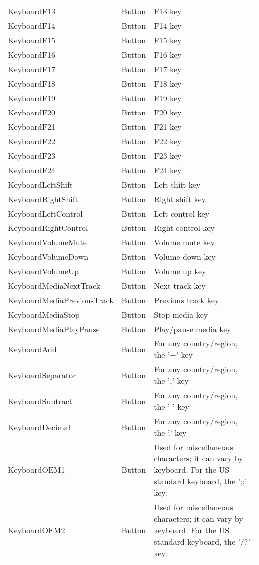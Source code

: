 \begin{center}
\begin{longtable}{ | l | l | p{9cm} |}
	KeyboardF13					&	Button	&	F13 key\\
	KeyboardF14					&	Button	&	F14 key\\
	KeyboardF15					&	Button	&	F15 key\\
	KeyboardF16					&	Button	&	F16 key\\
	KeyboardF17					&	Button	&	F17 key\\
	KeyboardF18					&	Button	&	F18 key\\
	KeyboardF19					&	Button	&	F19 key\\
	KeyboardF20					&	Button	&	F20 key\\
	KeyboardF21					&	Button	&	F21 key\\
	KeyboardF22					&	Button	&	F22 key\\
	KeyboardF23					&	Button	&	F23 key\\
	KeyboardF24					&	Button	&	F24 key\\
	KeyboardLeftShift			&	Button	&	Left shift key\\
	KeyboardRightShift			&	Button	&	Right shift key\\
	KeyboardLeftControl			&	Button	&	Left control key\\
	KeyboardRightControl		&	Button	&	Right control key\\
	KeyboardVolumeMute			&	Button	&	Volume mute key\\
	KeyboardVolumeDown			&	Button	&	Volume down key\\
	KeyboardVolumeUp			&	Button	&	Volume up key\\
	KeyboardMediaNextTrack		&	Button	&	Next track key\\
	KeyboardMediaPreviousTrack	&	Button	&	Previous track key\\
	KeyboardMediaStop			&	Button	&	Stop media key\\
	KeyboardMediaPlayPause		&	Button	&	Play/pause media key\\
	KeyboardAdd					&	Button	&	For any country/region, the '+' key\\
	KeyboardSeparator			&	Button	&	For any country/region, the ',' key\\
	KeyboardSubtract			&	Button	&	For any country/region, the '-' key\\
	KeyboardDecimal				&	Button	&	For any country/region, the '.' key\\
	KeyboardOEM1				&	Button	&	Used for miscellaneous characters; it can vary by keyboard. For the US standard keyboard, the ';:' key.\\
	KeyboardOEM2				&	Button	&	Used for miscellaneous characters; it can vary by keyboard. For the US standard keyboard, the '/?' key.\\

\end{longtable}
\end{center}
